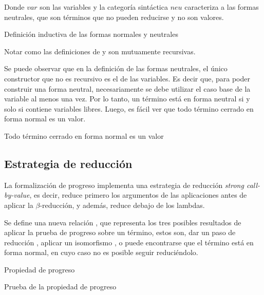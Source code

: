 Donde $var$ son las variables y la categoría sintáctica $neu$ caracteriza a las formas neutrales, que son términos que no pueden reducirse y no son valores.

\begin{codigo}
	Definición inductiva de las formas normales y neutrales
\end{codigo}

Notar como las definiciones de \type{$\Uparrow$} y \type{$\Downarrow$} son mutuamente recursivas.

Se puede observar que en la definición de las formas neutrales, el único constructor que no es recursivo es el de las variables.
Es decir que, para poder construir una forma neutral, necesariamente se debe utilizar el caso base de la variable al menos una vez.
Por lo tanto, un término está en forma neutral si y solo si contiene variables libres.
Luego, es fácil ver que todo término cerrado en forma normal es un valor.

\begin{codigo}
	Todo término cerrado en forma normal es un valor
\end{codigo}

\subsection{Estrategia de reducción}

La formalización de progreso implementa una estrategia de reducción \textit{strong call-by-value}, es decir, reduce primero los argumentos de las aplicaciones antes de aplicar la $\beta$-reducción, y además, reduce debajo de los lambdas.

Se define una nueva relación , que representa los tres posibles resultados de aplicar la prueba de progreso sobre un término, estos son, dar un paso de reducción \type{$\_\hookrightarrow\_$}, aplicar un isomorfismo \type{$\_\rightleftarrows\_$}, o puede encontrarse que el término está en forma normal, en cuyo caso no es posible seguir reduciéndolo.

\begin{codigo}
	Propiedad de progreso
\end{codigo}

\begin{codigo}
	Prueba de la propiedad de progreso
\end{codigo}

